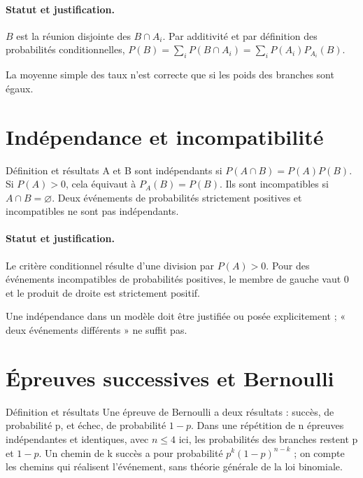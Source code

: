 \paragraph{Statut et justification.} $B$ est la réunion disjointe des $B\cap A_i$. Par additivité et par définition des probabilités conditionnelles, $P(B)=\sum_iP(B\cap A_i)=\sum_iP(A_i)P_{A_i}(B)$.
\label{C05-EX2}

\begin{erreur}La moyenne simple des taux n’est correcte que si les poids des branches sont égaux.\end{erreur}
\label{C05-AP2}
\section{Indépendance et incompatibilité}\label{C05-U3}
\begin{repere}{Définition et résultats}
A et B sont indépendants si $P(A\cap B)=P(A)P(B)$. Si $P(A)>0$, cela équivaut à $P_A(B)=P(B)$. Ils sont incompatibles si $A\cap B=\varnothing$. Deux événements de probabilités strictement positives et incompatibles ne sont pas indépendants.
\end{repere}
\paragraph{Statut et justification.} Le critère conditionnel résulte d’une division par $P(A)>0$. Pour des événements incompatibles de probabilités positives, le membre de gauche vaut 0 et le produit de droite est strictement positif.
\label{C05-EX3}
\begin{erreur}Une indépendance dans un modèle doit être justifiée ou posée explicitement ; « deux événements différents » ne suffit pas.\end{erreur}
\label{C05-AP3}
\section{Épreuves successives et Bernoulli}\label{C05-U4}
\begin{repere}{Définition et résultats}
Une épreuve de Bernoulli a deux résultats : succès, de probabilité p, et échec, de probabilité $1-p$. Dans une répétition de n épreuves indépendantes et identiques, avec $n\leq4$ ici, les probabilités des branches restent p et $1-p$. Un chemin de k succès a pour probabilité $p^k(1-p)^{n-k}$ ; on compte les chemins qui réalisent l’événement, sans théorie générale de la loi binomiale.
\end{repere}
